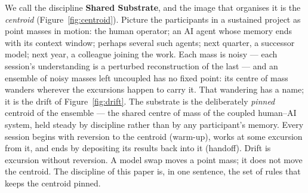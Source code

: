 \documentclass[11pt,a4paper,twocolumn]{article}
\begin{document}
We call the discipline \textbf{Shared Substrate}, and the image
that organises it is the \emph{centroid}
(Figure~\ref{fig:centroid}). Picture the participants in a
sustained project as point masses in motion: the human operator;
an AI agent whose memory ends with its context window; perhaps
several such agents; next quarter, a successor model; next year, a
colleague joining the work. Each mass is noisy --- each session's
understanding is a perturbed reconstruction of the last --- and an
ensemble of noisy masses left uncoupled has no fixed point: its
centre of mass wanders wherever the excursions happen to carry it.
That wandering has a name; it is the drift of
Figure~\ref{fig:drift}. The substrate is the deliberately
\emph{pinned} centroid of the ensemble --- the shared centre of
mass of the coupled human--AI system, held steady by
discipline rather than by any participant's memory. Every session
begins with reversion to the centroid (warm-up), works at some
excursion from it, and ends by depositing its results back into it
(handoff). Drift is excursion without reversion. A model swap
moves a point mass; it does not move the centroid. The discipline
of this paper is, in one sentence, the set of rules that keeps the
centroid pinned.
\end{document}
